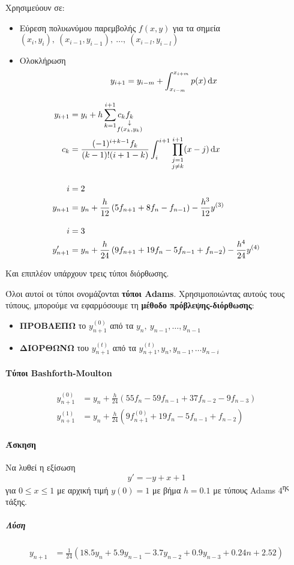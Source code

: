 \documentclass[11pt,a4paper,notitlepage,fleqn,final]{article}
\begin{document}
Χρησιμεύουν σε:
\begin{itemize}
	\item Εύρεση πολυωνύμου παρεμβολής \(
	f(x,y)
	 \) για τα σημεία \( (x_i,y_i),\ (x_{i-1},y_{i-1}),\ \dots,\
	 (x_{i-l},y_{i-l})
	  \)
	\item Ολοκλήρωση
	\[
	y_{i+1} = y_{i-m} + \int_{x_{i-m}}^{x_{i+m}} p(x)\mathop{}\!\mathrm{d} x
	\]
\end{itemize}

\begin{align*}
	y_{i+1} &= y_i +h\sum_{k=1}^{i+1} c_k
	\underset{\substack{\downarrow\\ \mathclap{f(x_k,y_k)}}}{f_k} \\
	c_k &= \frac{(-1)^{i+k-1}f_k}{(k-1)!(i+1-k)}
	\int_{i}^{i+1} \prod_{\substack{j=1\\j\neq k}}^{i+1}
	(x-j)\dif x \\[3ex]
	i &= 2\\
	y_{n+1} &=
	y_n + \frac{h}{12}\left(5f_{n+1}+8f_n-f_{n-1}\right)
	-\frac{h^3}{12}y^{(3)} \\[2ex]
	i &= 3\\
	y_{n+1}' &= y_n+\frac{h}{24}\left(
	9f_{n+1}+19f_n-5f_{n-1}+f_{n-2}
	\right) -\frac{h^4}{24}y^{(4)}
\end{align*}

Και επιπλέον υπάρχουν τρεις τύποι διόρθωσης.

Όλοι αυτοί οι τύποι ονομάζονται \textbf{τύποι Adams}. Χρησιμοποιώντας
αυτούς τους τύπους, μπορούμε να εφαρμόσουμε τη \textbf{μέθοδο
πρόβλεψης-διόρθωσης}:
\begin{itemize}
	\item \textbf{ΠΡΟΒΛΕΠΩ}
	το \( y_{n+1}^{(0)} \) από τα \( y_n,\ y_{n-1},\dots,
	y_{n-1} \)
	\item \textbf{ΔΙΟΡΘΩΝΩ}
	του \( y_{n+1}^{(t)} \) από τα \( y_{n+1}^{(t)}, y_n,y_{n-1},\dots
	y_{n-i} \)
\end{itemize}

\paragraph{Τύποι Bashforth-Moulton}
\begin{align*}
	y_{n+1}^{(0)} &= y_n+\frac{h}{24} \left(
	55f_n-59f_{n-1}+37f_{n-2}-9f_{n-3}
	\right) \\
	y_{n+1}^{(1)} &= y_n + \frac{h}{24} \left(
	9f_{n+1}^{(0)}+19f_n-5f_{n-1}+f_{n-2}
	\right)
\end{align*}

\paragraph{Άσκηση}
Να λυθεί η εξίσωση
\[
y' = -y+x+1
\] για \( 0\leq x \leq 1 \) με αρχική τιμή \( y(0)=1 \) με βήμα
\( h=0.1 \) με τύπους Adams 4\textsuperscript{ης} τάξης.
\subparagraph{Λύση}
\begin{align*}
	y_{n+1} &= \frac{1}{24} (18.5y_n
	+5.9y_{n-1}-3.7y_{n-2}+0.9y_{n-3}+0.24n+2.52)
\end{align*}
\end{document}
